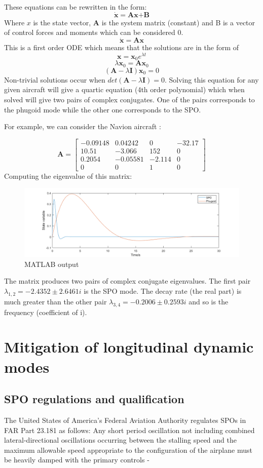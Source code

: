 \documentclass[
11pt, %
english, %
onehalfspacex, %
headsepline, %
] %
{MastersDoctoralThesis}
\begin{document}
These equations can be rewritten in the form:
$$\dot{\textbf{x}} = \textbf{Ax+B}$$
Where $x$ is the state vector, $\textbf{A}$ is the system matrix (constant) and B is a vector of control forces and moments which can be considered 0.
$$\dot{\textbf{x}}=\textbf{Ax}$$
This is a first order ODE which means that the solutions are in the form of $$\textbf{x}=\textbf{x}_{0}e^{\lambda t}$$
$$\lambda\textbf{x}_{0}=\textbf{Ax}_{0}$$
$$(\textbf{A}-\lambda\textbf{I})\textbf{x}_{0}=0$$
Non-trivial solutions occur when $det(\textbf{A}-\lambda\textbf{I})=0$. Solving this equation for any given aircraft will give a quartic equation (4th order polynomial) which when solved will give two pairs of complex conjugates. One of the pairs corresponds to the phugoid mode while the other one corresponds to the SPO. 

For example, we can consider the Navion aircraft \cite{navion}:

$$\textbf{A} = \begin{bmatrix}
-0.09148&0.04242&0&-32.17\\
10.51&-3.066&152&0\\
0.2054&-0.05581&-2.114&0\\
0&0&1&0
\end{bmatrix}$$
Computing the eigenvalue of this matrix:
\begin{figure}[h]
\centering
\includegraphics[scale=0.6]{DI.png}
\caption{MATLAB output}
\centering
\end{figure}
The matrix produces two pairs of complex conjugate eigenvalues. The first pair $\lambda_{1,2}= -2.4352 \pm 2.6461i$ is the SPO mode. The decay rate (the real part) is much greater than the other pair $\lambda_{3,4} = -0.2006 \pm 0.2593i$ and so is the frequency (coefficient of i). 
\section{Mitigation of longitudinal dynamic modes}

\subsection{SPO regulations and qualification}
The United States of America's Federal Aviation Authority regulates SPOs in FAR Part 23.181 \cite{far} as follows:
Any short period oscillation not including combined lateral-directional oscillations occurring between the stalling speed and the maximum allowable speed appropriate to the configuration of the airplane must be heavily damped with the primary controls -
\end{document}
